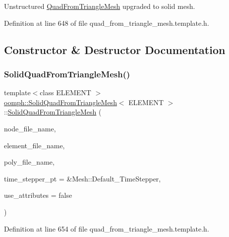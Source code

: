 Unstructured \hyperlink{classoomph_1_1QuadFromTriangleMesh}{Quad\+From\+Triangle\+Mesh} upgraded to solid mesh. 

Definition at line 648 of file quad\+\_\+from\+\_\+triangle\+\_\+mesh.\+template.\+h.



\subsection{Constructor \& Destructor Documentation}
\mbox{\label{classoomph_1_1SolidQuadFromTriangleMesh_ad4bc87ca77ca074e6153c383d04c1499}} 
\subsubsection{\texorpdfstring{Solid\+Quad\+From\+Triangle\+Mesh()}{SolidQuadFromTriangleMesh()}\hspace{0.1cm}{\footnotesize\ttfamily [1/2]}}
{\footnotesize\ttfamily template$<$class E\+L\+E\+M\+E\+NT $>$ \\
\hyperlink{classoomph_1_1SolidQuadFromTriangleMesh}{oomph\+::\+Solid\+Quad\+From\+Triangle\+Mesh}$<$ E\+L\+E\+M\+E\+NT $>$\+::\hyperlink{classoomph_1_1SolidQuadFromTriangleMesh}{Solid\+Quad\+From\+Triangle\+Mesh} (\begin{DoxyParamCaption}\item[{const std\+::string \&}]{node\+\_\+file\+\_\+name,  }\item[{const std\+::string \&}]{element\+\_\+file\+\_\+name,  }\item[{const std\+::string \&}]{poly\+\_\+file\+\_\+name,  }\item[{Time\+Stepper $\ast$}]{time\+\_\+stepper\+\_\+pt = {\ttfamily \&Mesh\+:\+:Default\+\_\+TimeStepper},  }\item[{const bool \&}]{use\+\_\+attributes = {\ttfamily false} }\end{DoxyParamCaption})\hspace{0.3cm}{\ttfamily [inline]}}



Definition at line 654 of file quad\+\_\+from\+\_\+triangle\+\_\+mesh.\+template.\+h.


